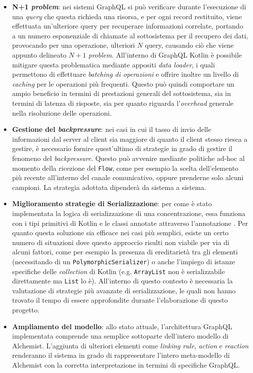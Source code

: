 \begin{itemize}
    \item \textbf{N+1 \textit{problem}}: nei sistemi GraphQL si può verificare durante l'esecuzione di una \textit{query} che questa richieda una risorsa, e per ogni record
        restituito, viene effettuata un'ulteriore query per recuperare informazioni correlate, portando a un numero esponenziale di chiamate al sottosistema per il recupero dei dati,
        provocando per una operazione, ulteriori $N$ query, causando ciò che viene appunto delineato $N+1$ \textit{problem}. All'interno di GraphQL Kotlin è possibile mitigare questa
        problematica mediante appositi \textit{data loader}, i quali permettono di effettuare \textit{batching di operazioni} e offrire inoltre un livello di \textit{caching} per le
        operazioni più frequenti. Questo può quindi comportare un ampio beneficio in termini di prestazioni generali del sottosistema, sia in termini di latenza di risposte,
        sia per quanto riguarda l'\textit{overhead} generale nella risoluzione delle operazioni.
    \item \textbf{Gestione del \textit{backpressure}}: nei casi in cui il tasso di invio delle informazioni dal server al client sia maggiore di quanto il client stesso riesca a gestire,
        è necessario fornire quest'ultimo di strategie in grado di gestire il fenomeno del \textit{backpressure}. Questo può avvenire mediante politiche ad-hoc al momento della ricezione
        del \texttt{Flow}, come per esempio la scelta dell'elemento più recente all'interno del canale comunicativo, oppure prenderne solo alcuni campioni. La strategia adottata
        dipenderà da sistema a sistema.
    \item \textbf{Miglioramento strategie di Serializzazione}: per come è stato implementata la logica di serializzazione di una concentrazione, essa funziona con i tipi primitivi di Kotlin
        e le classi annotate attraverso l'annotazione . Per quanto questa soluzione sia efficace nei casi più semplici, esiste un certo numero di situazioni dove
        questo approccio risulti non viabile per via di alcuni fattori, come per esempio la presenza di ereditarietà tra gli elementi (necessitando di un \texttt{PolymorphicSerializer}) o
        anche l'impiego di istanze specifiche delle \textit{collection} di Kotlin (e.g. \texttt{ArrayList} non è serializzabile direttamente ma \texttt{List} lo è). All'interno di questo contesto
        è necessaria la valutazione di strategie più avanzate di serializzazione, le quali non hanno trovato il tempo di essere approfondite durante l'elaborazione di questo progetto.
    \item \textbf{Ampliamento del modello}: allo stato attuale, l'architettura GraphQL implementata comprende una semplice sottoparte dell'intero modello di Alchemist. L'aggiunta di ulteriori
        elementi come \textit{linking rule}, \textit{action} e \textit{reaction} renderanno il sistema in grado di rappresentare l'intero meta-modello di Alchemist con la corretta interpretazione
        in termini di specifiche GraphQL.
\end{itemize}
